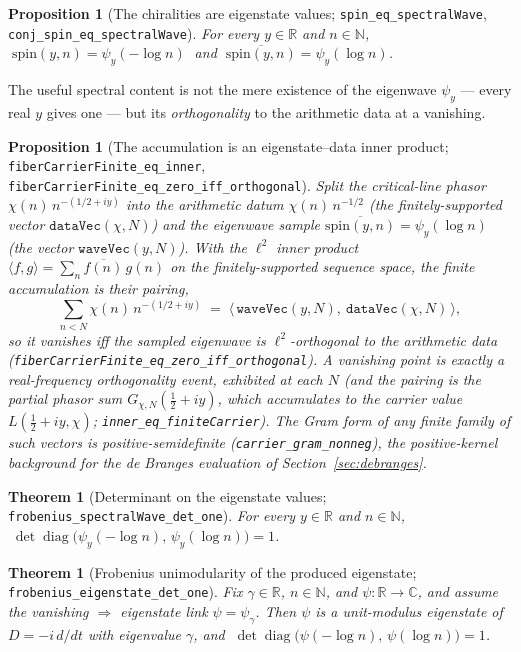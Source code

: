 \documentclass[11pt]{article}
\newtheorem{theorem}[definition]{Theorem}
\newtheorem{proposition}[definition]{Proposition}
\DeclareMathOperator{\diag}{diag}
\newcommand{\C}{\mathbb{C}}
\newcommand{\R}{\mathbb{R}}
\newcommand{\N}{\mathbb{N}}
\newcommand{\conj}[1]{\overline{#1}}
\newcommand{\code}[1]{\texttt{#1}}
\begin{document}
\begin{proposition}[The chiralities are eigenstate values; \code{spin\_eq\_spectralWave}, \code{conj\_spin\_eq\_spectralWave}]\label{prop:chiral}
For every $y\in\R$ and $n\in\N$, $\;\mathrm{spin}(y,n)=\psi_y(-\log n)\;$ and
$\;\conj{\mathrm{spin}(y,n)}=\psi_y(\log n)$.
\end{proposition}

The useful spectral content is not the mere existence of the eigenwave $\psi_y$ --- every real $y$
gives one --- but its \emph{orthogonality} to the arithmetic data at a vanishing.

\begin{proposition}[The accumulation is an eigenstate--data inner product; \code{fiberCarrierFinite\_eq\_inner}, \code{fiberCarrierFinite\_eq\_zero\_iff\_orthogonal}]\label{prop:ortho}
Split the critical-line phasor $\chi(n)\,n^{-(1/2+iy)}$ into the arithmetic datum
$\chi(n)\,n^{-1/2}$ (the finitely-supported vector $\code{dataVec}(\chi,N)$) and the eigenwave sample
$\conj{\mathrm{spin}(y,n)}=\psi_y(\log n)$ (the vector $\code{waveVec}(y,N)$). With the $\ell^2$ inner
product $\langle f,g\rangle=\sum_n\conj{f(n)}\,g(n)$ on the finitely-supported sequence space, the
finite accumulation is their pairing,
\[
  \sum_{n<N}\chi(n)\,n^{-(1/2+iy)} \;=\; \bigl\langle\,\code{waveVec}(y,N),\ \code{dataVec}(\chi,N)\,\bigr\rangle ,
\]
so it vanishes \emph{iff} the sampled eigenwave is $\ell^2$-orthogonal to the arithmetic data
(\code{fiberCarrierFinite\_eq\_zero\_iff\_orthogonal}). A vanishing point is exactly a real-frequency
orthogonality event, exhibited at each $N$ (and the pairing is the partial phasor sum
$G_{\chi,N}(\tfrac12+iy)$, which accumulates to the carrier value $L(\tfrac12+iy,\chi)$;
\code{inner\_eq\_finiteCarrier}). The Gram form of any finite family of such vectors is
positive-semidefinite (\code{carrier\_gram\_nonneg}), the positive-kernel background for the de Branges
evaluation of Section~\ref{sec:debranges}.
\end{proposition}

\begin{theorem}[Determinant on the eigenstate values; \code{frobenius\_spectralWave\_det\_one}]\label{thm:wavedet}
For every $y\in\R$ and $n\in\N$, $\;\det\diag\!\big(\psi_y(-\log n),\,\psi_y(\log n)\big)=1$.
\end{theorem}

\begin{theorem}[Frobenius unimodularity of the produced eigenstate; \code{frobenius\_eigenstate\_det\_one}]\label{thm:eigdet}
Fix $\gamma\in\R$, $n\in\N$, and $\psi:\R\to\C$, and \emph{assume} the vanishing $\Rightarrow$
eigenstate link $\psi=\psi_\gamma$. Then $\psi$ is a unit-modulus eigenstate of $D=-i\,d/dt$ with
eigenvalue $\gamma$, and $\;\det\diag\!\big(\psi(-\log n),\,\psi(\log n)\big)=1$.
\end{theorem}
\end{document}
